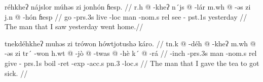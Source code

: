 \pex
\a
\begingl
\glpreamble réhkheʔ nájslor múhəs zi jonhón ɦesp. //
\gla r.h @ -kheʔ n´js @ -lár m.wh @ -əs zi j.n @ -hón ɦesp //
\glb go -{\sc prs}.3s live -{\sc loc} man -{\sc nom}.s {\sc rel} see -{\sc
pst}.1s yesterday //
\glft The man that I saw yesterday went home.//
\endgl

\a
\begingl
\glpreamble tnekdéhkheʔ muhəs zi trówon hówtjotushə káro. //
\gla tn.k @ -déh @ -kheʔ m.wh @ -əs zi tr´ -won h.wt @ -jò @ -twas @
-hè k´ @ -rá //
\glb {[be ill]} -{\sc inch} -{\sc prs}.3s man -{\sc nom}.s {\sc rel} give -{\sc
prs}.1s boil -{\sc ret} -{\sc exp} -{\sc acc}.s {\sc pn}.3 -{\sc loc}.s //
\glft The man that I gave the tea to got sick. //
\endgl
\xe

